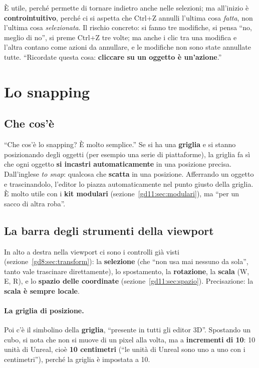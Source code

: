 È utile, perché permette di tornare indietro anche nelle selezioni; ma
all'inizio è \textbf{controintuitivo}, perché ci si aspetta che Ctrl+Z annulli
l'ultima cosa \emph{fatta}, non l'ultima cosa \emph{selezionata}. Il rischio
concreto: si fanno tre modifiche, si pensa ``no, meglio di no'', si preme Ctrl+Z
tre volte; ma anche i clic tra una modifica e l'altra contano come azioni da
annullare, e le modifiche non sono state annullate tutte. ``Ricordate questa
cosa: \textbf{cliccare su un oggetto è un'azione}.''

\section{Lo snapping}
\label{gd11:sec:snapping}

\subsection{Che cos'è}

``Che cos'è lo snapping? È molto semplice.'' Se si ha una \textbf{griglia} e si
stanno posizionando degli oggetti (per esempio una serie di piattaforme), la
griglia fa sì che ogni oggetto \textbf{si incastri automaticamente} in una
posizione precisa. Dall'inglese \emph{to snap}: qualcosa che \textbf{scatta} in
una posizione. Afferrando un oggetto e trascinandolo, l'editor lo piazza
automaticamente nel punto giusto della griglia. È molto utile con i
\textbf{kit modulari} (sezione~\ref{gd11:sec:modulari}), ma ``per un sacco di
altra roba''.

\subsection{La barra degli strumenti della viewport}

In alto a destra nella viewport ci sono i controlli già visti
(sezione~\ref{gd8:sec:transform}): la \textbf{selezione} (che ``non usa mai
nessuno da sola'', tanto vale trascinare direttamente), lo spostamento, la
\textbf{rotazione}, la \textbf{scala} (W, E, R), e lo \textbf{spazio delle
coordinate} (sezione~\ref{gd11:sec:spazio}). Precisazione: la \textbf{scala è
sempre locale}.

\paragraph{La griglia di posizione.} Poi c'è il simbolino della
\textbf{griglia}, ``presente in tutti gli editor 3D''. Spostando un cubo, si nota
che non si muove di un pixel alla volta, ma a \textbf{incrementi di 10}: 10
unità di Unreal, cioè \textbf{10 centimetri} (``le unità di Unreal sono uno a
uno con i centimetri''), perché la griglia è impostata a 10.

